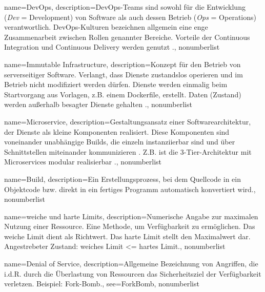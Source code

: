 {%
  name={DevOps},
  description={DevOps-Teams sind sowohl für die Entwicklung (\emph{Dev} = Development) von Software als auch dessen Betrieb (\emph{Ops} = Operations) verantwortlich. DevOps-Kulturen bezeichnen allgemein eine enge Zusammenarbeit zwischen Rollen genannter Bereiche. Vorteile der Continuous Integration und Continuous Delivery werden genutzt \cite{devops}.},
  nonumberlist
}

{%
  name={Immutable Infrastructure},
  description={Konzept für den Betrieb von serverseitiger Software. Verlangt, dass Dienste zustandslos operieren und im Betrieb nicht modifiziert werden dürfen. Dienste werden einmalig beim Startvorgang aus Vorlagen, z.B. einem Dockerfile, erstellt. Daten (Zustand) werden außerhalb besagter Dienste gehalten \cite{unikernelMeetsDocker}\cite{immutableInfrastructure}.},
  nonumberlist
}

{%
  name={Microservice},
  description={Gestaltungsansatz einer Softwarearchitektur, der Dienste als kleine Komponenten realisiert. Diese Komponenten sind voneinander unabhängige Builds, die einzeln instanziierbar sind und über Schnittstellen miteinander kommunizieren . Z.B. ist die 3-Tier-Architektur mit Microservices modular realisierbar \cite{microservices}.},
  nonumberlist
}

{%
  name={Build},
  description={Ein Erstellungsprozess, bei dem Quellcode in ein Objektcode bzw. direkt in ein fertiges Programm automatisch konvertiert wird.},
  nonumberlist
}

{%
  name={weiche und harte Limits},
  description={Numerische Angabe zur maximalen Nutzung einer Ressource. Eine Methode, um Verfügbarkeit zu ermöglichen. Das weiche Limit dient als Richtwert. Das harte Limit stellt den Maximalwert dar. Angestrebeter Zustand: weiches Limit \textless= hartes Limit.},
  nonumberlist
}

{%
  name={Denial of Service},
  description={Allgemeine Bezeichnung von Angriffen, die i.d.R. durch die Überlastung von Ressourcen das Sicherheitsziel der Verfügbarkeit verletzen. Beispiel: Fork-Bomb.},
  see={ForkBomb},
  nonumberlist
}

